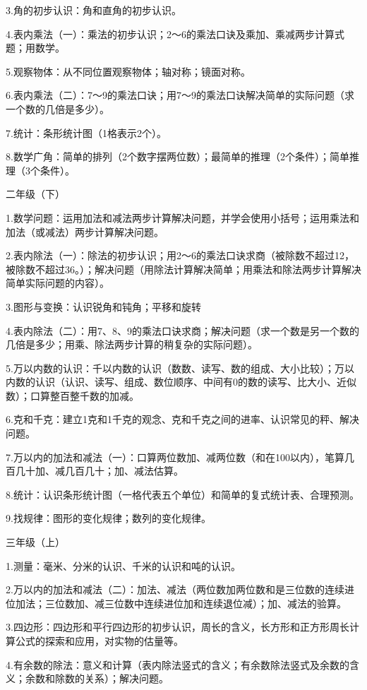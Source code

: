 3.角的初步认识：角和直角的初步认识。

4.表内乘法（一）：乘法的初步认识；2～6的乘法口诀及乘加、乘减两步计算式题；用数学。

5.观察物体：从不同位置观察物体；轴对称；镜面对称。

6.表内乘法（二）：7～9的乘法口诀；用7～9的乘法口诀解决简单的实际问题（求一个数的几倍是多少）。

7.统计：条形统计图（1格表示2个）。

8.数学广角：简单的排列（2个数字摆两位数）；最简单的推理（2个条件）；简单推理（3个条件）。

二年级（下）

1.数学问题：运用加法和减法两步计算解决问题，并学会使用小括号；运用乘法和加法（或减法）两步计算解决问题。

2.表内除法（一）：除法的初步认识；用2～6的乘法口诀求商（被除数不超过12，被除数不超过36。）；解决问题（用除法计算解决简单；用乘法和除法两步计算解决简单实际问题的内容）。

3.图形与变换：认识锐角和钝角；平移和旋转

4.表内除法（二）：用7、8、9的乘法口诀求商；解决问题（求一个数是另一个数的几倍是多少；用乘、除法两步计算的稍复杂的实际问题）。

5.万以内数的认识：千以内数的认识（数数、读写、数的组成、大小比较）；万以内数的认识（认识、读写、组成、数位顺序、中间有0的数的读写、比大小、近似数）；口算整百整千数的加减。

6.克和千克：建立1克和1千克的观念、克和千克之间的进率、认识常见的秤、解决问题。

7.万以内的加法和减法（一）：口算两位数加、减两位数（和在100以内），笔算几百几十加、减几百几十；加、减法估算。

8.统计：认识条形统计图（一格代表五个单位）和简单的复式统计表、合理预测。

9.找规律：图形的变化规律；数列的变化规律。

三年级（上）

1.测量：毫米、分米的认识、千米的认识和吨的认识。

2.万以内的加法和减法（二）：加法、减法（两位数加两位数和是三位数的连续进位加法；三位数加、减三位数中连续进位加和连续退位减）；加、减法的验算。

3.四边形：四边形和平行四边形的初步认识，周长的含义，长方形和正方形周长计算公式的探索和应用，对实物的估量等。

4.有余数的除法：意义和计算（表内除法竖式的含义；有余数除法竖式及余数的含义；余数和除数的关系）；解决问题。

